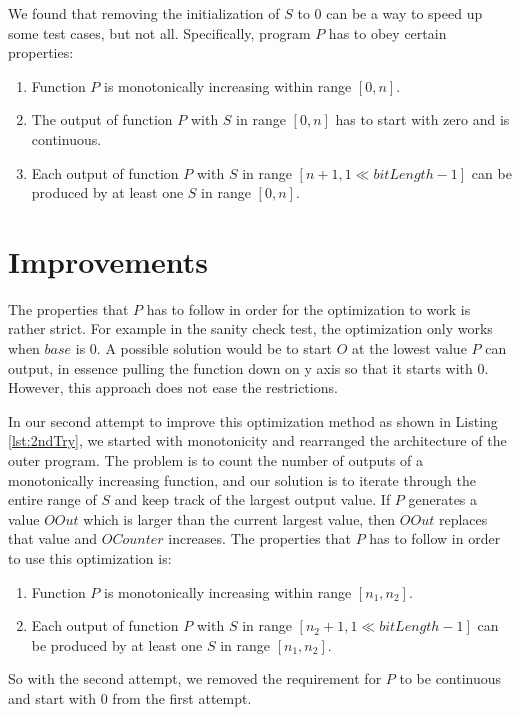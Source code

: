 We found that removing the initialization of $S$ to $0$ can be a way to speed up some test cases, but not all. Specifically, program $P$ has to obey certain properties:

\begin{enumerate}
\item Function $P$ is monotonically increasing within range $[0, n]$.
\item The output of function $P$ with $S$ in range $[0, n]$ has to start with zero and is continuous.
\item Each output of function $P$ with $S$ in range $[n+1, 1\ll bitLength-1]$ can be produced by at least one $S$ in range $[0, n]$.
\end{enumerate}

\section{Improvements}
The properties that $P$ has to follow in order for the optimization to work is rather strict. For example in the sanity check test, the optimization only works when $base$ is $0$. A possible solution would be to start $O$ at the lowest value $P$ can output, in essence pulling the function down on y axis so that it starts with $0$. However, this approach does not ease the restrictions.

In our second attempt to improve this optimization method as shown in Listing \ref{lst:2ndTry}, we started with monotonicity and rearranged the architecture of the outer program. The problem is to count the number of outputs of a monotonically increasing function, and our solution is to iterate through the entire range of $S$ and keep track of the largest output value. If $P$ generates a value $OOut$ which is larger than the current largest value, then $OOut$ replaces that value and $OCounter$ increases. The properties that $P$ has to follow in order to use this optimization is:

\begin{enumerate}
\item Function $P$ is monotonically increasing within range $[n_{1}, n_{2}]$.
\item Each output of function $P$ with $S$ in range $[n_{2}+1, 1\ll bitLength-1]$ can be produced by at least one $S$ in range $[n_{1}, n_{2}]$.
\end{enumerate}

So with the second attempt, we removed the requirement for $P$ to be continuous and start with $0$ from the first attempt.

